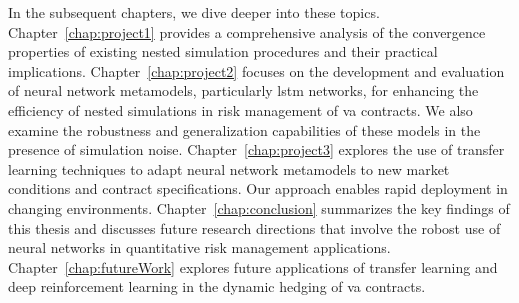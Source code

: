 In the subsequent chapters, we dive deeper into these topics.
Chapter~\ref{chap:project1} provides a comprehensive analysis of the convergence properties of existing nested simulation procedures and their practical implications.
Chapter~\ref{chap:project2} focuses on the development and evaluation of neural network metamodels, particularly \gls{lstm} networks, for enhancing the efficiency of nested simulations in risk management of \gls{va} contracts.
We also examine the robustness and generalization capabilities of these models in the presence of simulation noise.
Chapter~\ref{chap:project3} explores the use of transfer learning techniques to adapt neural network metamodels to new market conditions and contract specifications.
Our approach enables rapid deployment in changing environments.
Chapter~\ref{chap:conclusion} summarizes the key findings of this thesis and discusses future research directions that involve the robost use of neural networks in quantitative risk management applications.
Chapter~\ref{chap:futureWork} explores future applications of transfer learning and deep reinforcement learning in the dynamic hedging of \gls{va} contracts.
